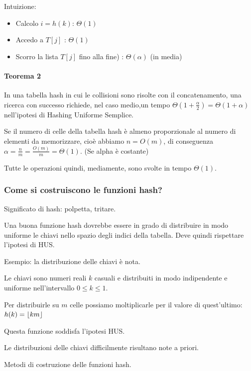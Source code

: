 \documentclass[11pt,a4paper,twoside,openright]{book}
\DeclarePairedDelimiter\floor{\lfloor}{\rfloor}
\providecommand{\tightlist}{\setlength{\itemsep}{0pt}\setlength{\parskip}{0pt}}
\let\oldparagraph\paragraph
\renewcommand{\paragraph}[1]{\oldparagraph{#1}\mbox{}}
\begin{document}
{Intuizione:}

\begin{itemize}
\tightlist
\item
  {Calcolo $i=h(k)$: $\Theta(1)$}
\item
  {Accedo a $T[j]$ : $\Theta(1)$}
\item
  {Scorro la lista $T[j]$ fino alla fine) : $\Theta(\alpha)$ (in media)}
\end{itemize}

\paragraph{Teorema 2}

{In una tabella hash in cui le collisioni sono risolte con il concatenamento, una ricerca con successo richiede, nel caso medio,un tempo $\Theta(1+\frac{\alpha}{2}) = \Theta(1+\alpha)$ nell'ipotesi di Hashing Uniforme Semplice.}

{Se il numero di celle della tabella hash è almeno proporzionale al numero di elementi da memorizzare, cioè abbiamo $n=O(m)$, di conseguenza \\ $\alpha=\frac{n}{m} = \frac{O(m)}{m}=\Theta(1)$. (Se alpha è costante) }

Tutte le operazioni quindi, mediamente, sono svolte in tempo $\Theta(1)$.


\subsubsection{Come si costruiscono le funzioni hash?}

{Significato di hash: polpetta, tritare.}

{Una buona funzione hash dovrebbe essere in grado di distribuire in modo
uniforme le chiavi nello spazio degli indici della tabella. Deve quindi
rispettare l'ipotesi di HUS.}

{Esempio: la distribuzione delle chiavi è nota.}

{Le chiavi sono numeri reali $k$ casuali e distribuiti in modo indipendente e uniforme nell'intervallo $0 \leq k \leq 1$.}

{Per distribuirle su $m$ celle possiamo moltiplicarle per il valore di quest'ultimo: $h(k) = \floor{km}$}

{Questa funzione soddisfa l'ipotesi HUS.}

{Le distribuzioni delle chiavi difficilmente risultano note a priori. }

{Metodi di costruzione delle funzioni hash.}
\end{document}
